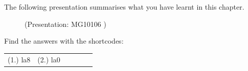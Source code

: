 \begin{enumerate}[noitemsep, label=\textbf{\arabic*}. ]
\begin{figure}[H]
\begin{center}
      \vspace{2pt}
    \vspace{.1in}
    
    \end{center}

 \end{figure}   

    \addtocounter{footnote}{-0}
            \end{enumerate}
        
          

        
      \label{m39414*eip-749}The following presentation summarises what you have learnt in this chapter.

    \setcounter{subfigure}{0}


	\begin{figure}[H] %
    
    \label{m39414*slidesharemedia}\label{m39414*slideshareflash} { (Presentation:  MG10106 )}
      
      \vspace{2pt}
    \vspace{.1in}
    
    

 \end{figure}   

    \addtocounter{footnote}{-0}
    \par 
    
    \label{m39414*eip-300}
\par {} Find the answers with the shortcodes:
 \par \begin{tabular}[h]{cccccc}
 (1.) la8  &  (2.) la0  & \end{tabular}



